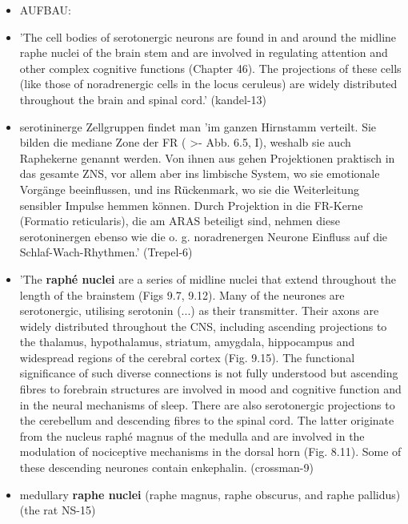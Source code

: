 \documentclass[12pt,a4paper,pdftex]{article}
\begin{document}
\begin{itemize}{}
    \item AUFBAU:
    \item 'The cell bodies of serotonergic neurons are found in and around the midline raphe nuclei of the brain stem and are involved in regulating attention and other complex cognitive functions (Chapter 46). The projections of these cells (like those of noradrenergic cells in the locus ceruleus) are widely distributed throughout the brain and spinal cord.' (kandel-13)
    \item serotininerge Zellgruppen findet man 'im ganzen Hirnstamm verteilt. Sie bilden die mediane Zone der FR ( >- Abb. 6.5, I), weshalb sie auch Raphekerne genannt werden. Von ihnen aus gehen Projektionen praktisch in das gesamte ZNS, vor allem aber ins limbische System, wo sie emotionale Vorgänge beeinflussen, und ins Rückenmark, wo sie die Weiterleitung sensibler Impulse hemmen können. Durch Projektion in die FR-Kerne (Formatio reticularis), die am ARAS beteiligt sind, nehmen diese serotoninergen ebenso wie die o. g. noradrenergen Neurone Einfluss auf die Schlaf-Wach-Rhythmen.' (Trepel-6)
    \item 'The \textbf{raphé nuclei} are a series of midline nuclei that extend throughout the length of the brainstem (Figs 9.7, 9.12). Many of the neurones are serotonergic, utilising serotonin (...) as their transmitter. Their axons are widely distributed throughout the CNS, including ascending projections to the thalamus, hypothalamus, striatum, amygdala, hippocampus and widespread regions of the cerebral cortex (Fig. 9.15). The functional significance of such diverse connections is not fully understood but ascending fibres to forebrain structures are involved in mood and cognitive function and in the neural mechanisms of sleep. There are also serotonergic projections to the cerebellum and descending fibres to the spinal cord. The latter originate from the nucleus raphé magnus of the medulla and are involved in the modulation of nociceptive mechanisms in the dorsal horn (Fig. 8.11). Some of these descending neurones contain enkephalin. (crossman-9)
    \item medullary \textbf{raphe nuclei} (raphe magnus, raphe obscurus, and raphe pallidus) (the rat NS-15)
\end{itemize}
    
\end{document}
